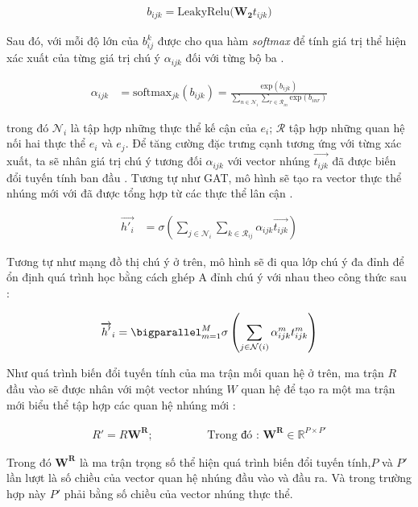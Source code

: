 \begin{align}
b_{ijk} = \text{LeakyRelu}\Big( \mathbf{W_2} t_{ijk} \Big)
\end{align}

Sau đó, với mỗi độ lớn của $b^k_{ij}$ được cho qua hàm \textit{softmax} để tính giá trị thể hiện xác xuất của từng giá trị chú ý $\alpha_{ijk}$ đối với từng bộ ba .

\begin{align}
{\alpha_{ijk}}&={\text{softmax}_{jk}(b_{ijk})} =\frac{\text{exp}(b_{ijk})}{\sum_{n\in \mathcal{N}_i} \sum_{r\in \mathcal{R}_{in}}\text{exp}(b_{inr})}
\end{align}

trong đó $\mathcal{N}_i$ là tập hợp những thực thể kế cận của $e_i$; $\mathcal{R}$ tập hợp những quan hệ nối hai thực thể $e_i$ và $e_j$. Để tăng cường đặc trưng cạnh tương ứng với từng xác xuất, ta sẽ nhân giá trị chú ý tương đối $\alpha_{ijk}$ với vector nhúng $\overrightarrow{t_{ijk}}$ đã được biến đổi tuyến tính ban đầu . Tương tự như GAT, mô hình sẽ tạo ra vector thực thể nhúng mới với đã được tổng hợp từ các thực thể lân cận .

\begin{align}
{\overrightarrow{h'_{i}}}&={\sigma\left(\sum_{j \in \mathcal{N}_i} \sum_{k \in \mathcal{R}_{ij}} \alpha_{ijk} \overrightarrow{t_{ijk}}\right)}
\end{align}

Tương tự như mạng đồ thị chú ý ở trên, mô hình sẽ đi qua lớp chú ý đa đỉnh để ổn định quá trình học bằng cách ghép A đỉnh chú ý với nhau theo công thức sau :

\begin{align}
\overrightarrow{h'}_i=\bigparallel_{m=1}^{M} \sigma\left(\sum_{j\in \mathcal{N}(i)}\alpha_{ijk}^{m}t^{m}_{ijk}\right)
\end{align}

Như quá trình biến đổi tuyến tính của ma trận mối quan hệ ở trên, ma trận $R$ đầu vào sẽ được nhân với một vector nhúng $W$ quan hệ để tạo ra một ma trận mới biểu thể tập hợp các quan hệ nhúng mới :

\begin{align}
R' = R \mathbf{W^R}; \hspace{2cm} \text{Trong đó : } \mathbf{W^R} \in \mathbb{R}^{P \times P'}
\end{align}

Trong đó $\mathbf{W^R}$ là ma trận trọng số thể hiện quá trình biến đổi tuyến tính,$P$ và $P'$ lần lượt là số chiều của vector quan hệ nhúng đầu vào và đầu ra. Và trong trường hợp này  $P'$ phải bằng số chiều của vector nhúng thực thể.

